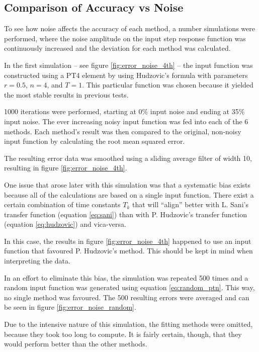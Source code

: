 \subsection{Comparison of Accuracy vs Noise}

To see how noise affects the accuracy of each method, a number  simulations were
performed, where the noise amplitude on  the  input  step  response function was
continuously increased and the deviation for each method was calculated.

In  the first simulation -- see figure \ref{fig:error_noise_4th}  --  the  input
function was constructed using  a  PT4  element by using Hudzovic's formula with
parameters  $r=0.5$, $n=4$, and  $T=1$.  This  particular  function  was  chosen
because it yielded the most stable results in previous tests.

1000 iterations were performed, starting at 0\% input noise  and  ending at 35\%
input noise. The ever increasing noisy input function was fed into each of the 6
methods. Each method's result was then compared to the original, non-noisy input
function by calculating the root mean squared error.

The resulting error data  was  smoothed  using a sliding average filter of width
10, resulting in figure \ref{fig:error_noise_4th}.

One  issue that arose later with this simulation  was  that  a  systematic  bias
exists  because  all of the calculations are based on a single  input  function.
There  exist a certain combination of time constants $T_k$ that  will  ``align''
better  with  L.  Sani's transfer function (equation \ref{eq:sani}) than with P.
Hudzovic's  transfer  function  (equation   \ref{eq:hudzovic})  and  vica-versa.

In this case, the results in figure \ref{fig:error_noise_4th} happened to use an
input function that favoured P. Hudzovic's method.  This  should be kept in mind
when interpreting the data.

In an effort to eliminate this bias, the simulation was repeated 500 times and a
random  input  function  was generated using equation \ref{eq:random_ptn}.  This
way, no single  method  was favoured. The 500 resulting errors were averaged and
can be seen in figure \ref{fig:error_noise_random}.

Due  to  the  intensive nature of this  simulation,  the  fitting  methods  were
omitted,  because they took too long to compute. It is fairly  certain,  though,
that they would perform better than the other methods.

